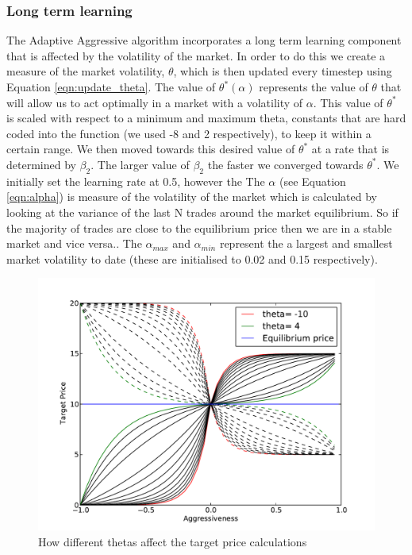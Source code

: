 \documentclass[preprint]{acm_proc_article-sp} %
\begin{document}
\subsubsection{Long term learning} \label{sec:AA_long_term_learning}
The Adaptive Aggressive algorithm incorporates a long term learning component
that is affected by the volatility of the market. In order to do this we create
a measure of the market volatility, $\theta$, which is then updated every
timestep using Equation \ref{eqn:update_theta}. The value of $\theta^*(\alpha)$
represents the value of $\theta$ that will allow us to act optimally in a
market with a volatility of $\alpha$. This value of $\theta^*$ is scaled with
respect to a minimum and maximum theta, constants that are hard coded into the
function (we used -8 and 2 respectively), to keep it within a certain range.
We then moved towards this desired value of $\theta^*$ at a rate that is
determined by $\beta_2$. The larger value of $\beta_2$ the faster we converged
towards $\theta^*$. We initially set the learning rate at 0.5, however the 
The $\alpha$ (see Equation
\ref{eqn:alpha}) is measure of the volatility of the market which is calculated
by looking at the variance of the last N trades around the market equilibrium.
So if the majority of trades are close to the equilibrium price then we are in
a stable market and vice versa.. The $\alpha_{max}$ and $\alpha_{min}$
represent the a largest and smallest market volatility to date (these are
initialised to 0.02 and 0.15 respectively).

\begin{figure}
  \centering
  \includegraphics[width=\columnwidth]{graphs_and_stats/graph_thetas.pdf}
  \caption{How different thetas affect the target price calculations}
  \label{fig:theta}
\end{figure}
\end{document}
